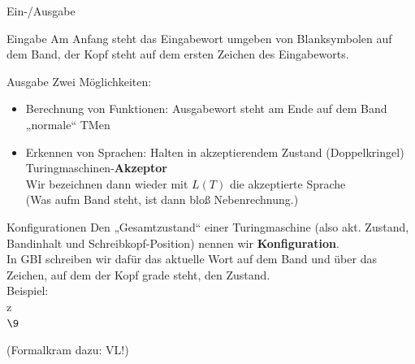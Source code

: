 \begin{frame}{Ein-/Ausgabe}
	\begin{block}{Eingabe}
		Am Anfang steht das Eingabewort umgeben von Blanksymbolen auf dem Band, der Kopf steht auf dem ersten Zeichen des Eingabeworts.
	\end{block}
	\pause
	
	\begin{block}{Ausgabe}
		Zwei Möglichkeiten:
		\begin{itemize}[<+->]
			\item Berechnung von Funktionen: Ausgabewort steht am Ende auf dem Band \\
			\impl „normale“ TMen
			\item Erkennen von Sprachen: Halten in akzeptierendem Zustand (Doppelkringel)\\
			\impl Turingmaschinen-\textbf{Akzeptor} \\
				  Wir bezeichnen dann wieder mit $L(T)$ die akzeptierte Sprache \\
				  (Was aufm Band steht, ist dann bloß Nebenrechnung.)
		\end{itemize}
	\end{block}
\end{frame}

\begin{frame}{Konfigurationen}
	Den „Gesamtzustand“ einer Turingmaschine (also akt. Zustand, Bandinhalt und Schreibkopf-Position) nennen wir \textbf{Konfiguration}. \\ \pause
	\medskip
	In GBI schreiben wir dafür das aktuelle Wort auf dem Band und über das Zeichen, auf dem der Kopf grade steht, den Zustand. \\
	Beispiel: \\
	\bigskip
	\mbox{}z \\
	\mbox{$\9$}
	
	\pause \bigskip
	(Formalkram dazu: \impl VL!)
\end{frame}

